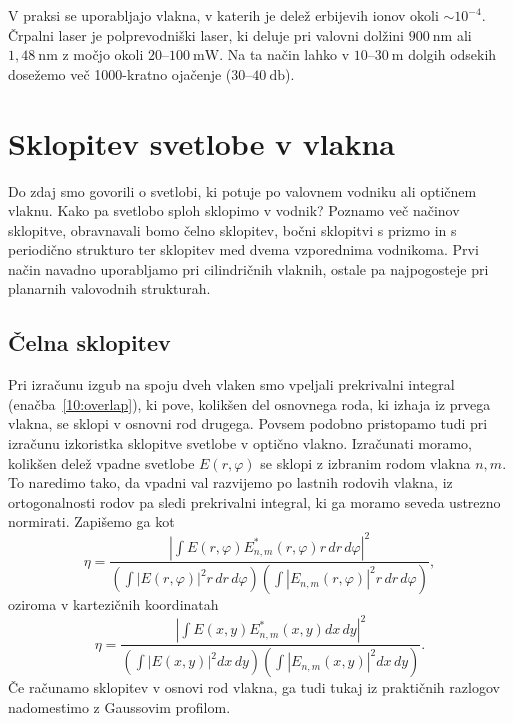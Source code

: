 V praksi se uporabljajo vlakna, v katerih je delež erbijevih ionov okoli $\sim 10^{-4}$. 
Črpalni laser je polprevodniški laser, ki 
deluje pri valovni dolžini $900~\si{\nano\meter}$ ali $1,48~\si{\nano\meter}$ 
z močjo okoli $20$--$100~\si{\milli\watt}$. Na ta način lahko v $10$--$30~\si{\meter}$
dolgih odsekih dosežemo več 1000-kratno ojačenje ($30$--$40~\si{\decibel}$).

\section{Sklopitev svetlobe v vlakna}
Do zdaj smo govorili o svetlobi, ki potuje po valovnem vodniku ali optičnem vlaknu. Kako pa 
svetlobo sploh sklopimo v vodnik? Poznamo več načinov sklopitve, obravnavali bomo 
čelno sklopitev, bočni sklopitvi s prizmo in s periodično strukturo ter  
sklopitev med dvema vzporednima vodnikoma. Prvi način 
navadno uporabljamo pri cilindričnih vlaknih, ostale pa najpogosteje pri planarnih valovodnih strukturah.

\subsection*{Čelna sklopitev}
Pri izračunu izgub na spoju dveh vlaken smo vpeljali prekrivalni integral (enačba~\ref{10:overlap}), 
ki pove, kolikšen del osnovnega roda, ki izhaja iz prvega vlakna, se sklopi v osnovni 
rod drugega. Povsem podobno pristopamo tudi pri izračunu izkoristka sklopitve svetlobe v optično vlakno.
Izračunati moramo, kolikšen delež vpadne svetlobe $E(r, \varphi)$ se sklopi z izbranim rodom 
vlakna $n,m$. To naredimo tako, da vpadni val razvijemo po lastnih rodovih vlakna, iz ortogonalnosti
rodov pa sledi prekrivalni integral, ki ga moramo seveda ustrezno normirati. Zapišemo ga kot
\begin{equation}
\eta = \frac{|\int E(r, \varphi) E^*_{n,m}(r, \varphi) r\, dr\, d\varphi|^2}
{\left(\int |E(r, \varphi)|^2 r\, dr\, d\varphi \right) \left(\int |E_{n,m}(r, \varphi)|^2 
r\, dr\, d\varphi \right)},
\end{equation}
oziroma v kartezičnih koordinatah
\begin{equation}
\eta = \frac{|\int E(x,y) E^*_{n,m}(x,y) dx\, dy|^2}
{\left(\int |E(x, y)|^2 dx\,dy \right) \left(\int |E_{n,m}(x, y)|^2 
dx\, dy \right)}.
\end{equation}
Če računamo sklopitev v osnovi rod vlakna, ga tudi tukaj iz praktičnih razlogov nadomestimo 
z Gaussovim profilom.


